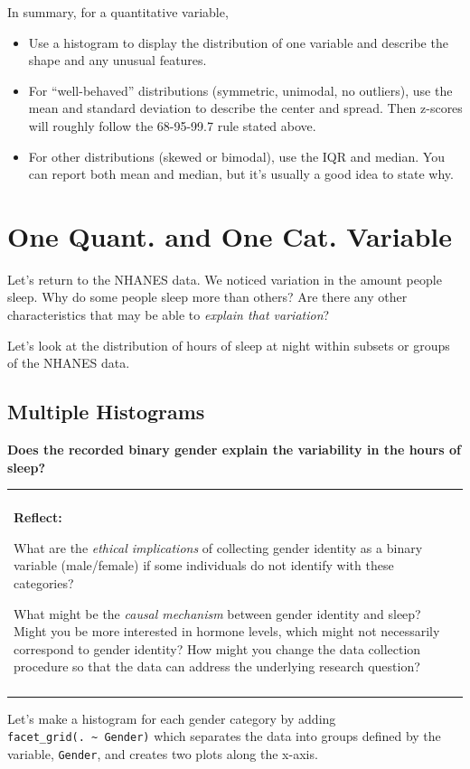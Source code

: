 \documentclass[
]{book}
\providecommand{\tightlist}{%
  \setlength{\itemsep}{0pt}\setlength{\parskip}{0pt}}
\newenvironment{reflect}
{
    \begin{center}
    
    \begin{tabular}{|p{0.8\textwidth}|}
    \rowcolor{LightBlue}
    \hline\\
    \rowcolor{LightBlue}
    \textbf{Reflect:}
}
{
    \\\rowcolor{LightBlue}
    \\\hline
    \end{tabular} 
    \end{center}
}
\begin{document}
In summary, for a quantitative variable,

\begin{itemize}
\tightlist
\item
  Use a histogram to display the distribution of one variable and describe the shape and any unusual features.
\item
  For ``well-behaved'' distributions (symmetric, unimodal, no outliers), use the mean and standard deviation to describe the center and spread. Then z-scores will roughly follow the 68-95-99.7 rule stated above.
\item
  For other distributions (skewed or bimodal), use the IQR and median. You can report both mean and median, but it's usually a good idea to state why.
\end{itemize}

\section{One Quant. and One Cat. Variable}\label{one-quant.-and-one-cat.-variable}

Let's return to the NHANES data. We noticed variation in the amount people sleep. Why do some people sleep more than others? Are there any other characteristics that may be able to \emph{explain that variation}?

Let's look at the distribution of hours of sleep at night within subsets or groups of the NHANES data.

\subsection{Multiple Histograms}\label{multiple-histograms}

\textbf{Does the recorded binary gender explain the variability in the hours of sleep?}

\begin{reflect}
What are the \emph{ethical implications} of collecting gender identity
as a binary variable (male/female) if some individuals do not identify
with these categories?

What might be the \emph{causal mechanism} between gender identity and
sleep? Might you be more interested in hormone levels, which might not
necessarily correspond to gender identity? How might you change the data
collection procedure so that the data can address the underlying
research question?
\end{reflect}

Let's make a histogram for each gender category by adding \texttt{facet\_grid(.\ \textasciitilde{}\ Gender)} which separates the data into groups defined by the variable, \texttt{Gender}, and creates two plots along the x-axis.
\end{document}
